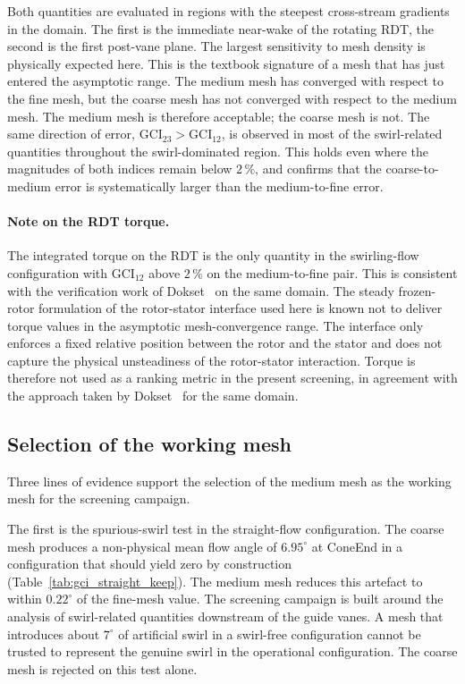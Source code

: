 Both quantities are evaluated in regions with the steepest cross-stream gradients in the domain. The first is the immediate near-wake of the rotating RDT, the second is the first post-vane plane. The largest sensitivity to mesh density is physically expected here. This is the textbook signature of a mesh that has just entered the asymptotic range. The medium mesh has converged with respect to the fine mesh, but the coarse mesh has not converged with respect to the medium mesh. The medium mesh is therefore acceptable; the coarse mesh is not. The same direction of error, $\mathrm{GCI}_{23} > \mathrm{GCI}_{12}$, is observed in most of the swirl-related quantities throughout the swirl-dominated region. This holds even where the magnitudes of both indices remain below $2\,\%$, and confirms that the coarse-to-medium error is systematically larger than the medium-to-fine error.

\paragraph{Note on the RDT torque.}
The integrated torque on the RDT is the only quantity in the swirling-flow configuration with $\mathrm{GCI}_{12}$ above $2\,\%$ on the medium-to-fine pair. This is consistent with the verification work of Dokset~\cite{Dokset2025} on the same domain. The steady frozen-rotor formulation of the rotor-stator interface used here is known not to deliver torque values in the asymptotic mesh-convergence range. The interface only enforces a fixed relative position between the rotor and the stator and does not capture the physical unsteadiness of the rotor-stator interaction. Torque is therefore not used as a ranking metric in the present screening, in agreement with the approach taken by Dokset~\cite{Dokset2025} for the same domain.

\subsection{Selection of the working mesh}
\label{sec:gci_pick}

Three lines of evidence support the selection of the medium mesh as the working mesh for the screening campaign.

The first is the spurious-swirl test in the straight-flow configuration. The coarse mesh produces a non-physical mean flow angle of $6.95^\circ$ at ConeEnd in a configuration that should yield zero by construction (Table~\ref{tab:gci_straight_keep}). The medium mesh reduces this artefact to within $0.22^\circ$ of the fine-mesh value. The screening campaign is built around the analysis of swirl-related quantities downstream of the guide vanes. A mesh that introduces about $7^\circ$ of artificial swirl in a swirl-free configuration cannot be trusted to represent the genuine swirl in the operational configuration. The coarse mesh is rejected on this test alone.

